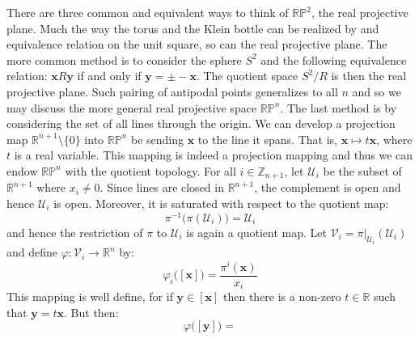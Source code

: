 \documentclass{article}                                                        %
\begin{document}
        \begin{example}
            There are three common and equivalent ways to think of
            $\mathbb{RP}^{2}$, the real projective plane. Much the way the
            torus and the Klein bottle can be realized by and equivalence
            relation on the unit square, so can the real projective plane. The
            more common method is to consider the sphere $S^{2}$ and the
            following equivalence relation: $\mathbf{x}R\mathbf{y}$ if and only
            if $\mathbf{y}=\pm\minus\mathbf{x}$. The quotient space
            $S^{2}/R$ is then the real projective plane. Such pairing of
            antipodal points generalizes to all $n$ and so we may discuss the
            more general real projective space $\mathbb{RP}^{n}$. The last
            method is by considering the set of all lines through the origin.
            We can develop a projection map $\mathbb{R}^{n+1}\setminus\{0\}$
            into $\mathbb{RP}^{n}$ be sending $\mathbf{x}$ to the line it spans.
            That is, $\mathbf{x}\mapsto{t}\mathbf{x}$, where $t$ is a real
            variable. This mapping is indeed a projection mapping and thus we
            can endow $\mathbb{RP}^{n}$ with the quotient topology. For all
            $i\in\mathbb{Z}_{n+1}$, let $\mathcal{U}_{i}$ be the subset of
            $\mathbb{R}^{n+1}$ where $x_{i}\ne{0}$. Since lines are closed in
            $\mathbb{R}^{n+1}$, the complement is open and hence
            $\mathcal{U}_{i}$ is open. Moreover, it is saturated with respect to
            the quotient map:
            \begin{equation}
                \pi^{\minus{1}}\big(\pi(\mathcal{U}_{i})\big)=\mathcal{U}_{i}
            \end{equation}
            and hence the restriction of $\pi$ to $\mathcal{U}_{i}$ is again a
            quotient map. Let
            $\mathcal{V}_{i}=\pi|_{\mathcal{U}_{i}}(\mathcal{U}_{i})$ and define
            $\varphi:\mathcal{V}_{i}\rightarrow\mathbb{R}^{n}$ by:
            \begin{equation}
                \varphi_{i}\big([\mathbf{x}]\big)=
                    \frac{\pi^{i}(\mathbf{x})}{x_{i}}
            \end{equation}
            This mapping is well define, for if $\mathbf{y}\in[\mathbf{x}]$ then
            there is a non-zero $t\in\mathbb{R}$ such that
            $\mathbf{y}=t\mathbf{x}$. But then:
            \begin{equation}
                \varphi\big([\mathbf{y}]\big)=

\end{equation}
\end{example}
\end{document}

